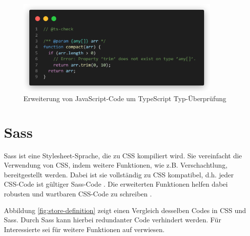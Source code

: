 \begin{figure}[H]
  \includegraphics[width=0.9\textwidth]{images/typescript-example-js.png}
  \centering
  \caption[Erweiterung von JavaScript-Code um TypeScript Typ-Überprüfung]{Erweiterung von JavaScript-Code um TypeScript Typ-Überprüfung}
  \label{fig:typescript-js}
\end{figure}

%
%
\section{Sass}
\label{sec:sass}
Sass ist eine Stylesheet-Sprache, die zu CSS kompiliert wird. Sie vereinfacht die Verwendung von CSS, indem weitere Funktionen, wie z.B. Verschachtlung, bereitgestellt werden. Dabei ist sie vollständig zu CSS kompatibel, d.h. jeder CSS-Code ist gültiger Sass-Code \cite[vgl.][]{SassDocs}. Die erweiterten Funktionen helfen dabei robusten und wartbaren CSS-Code zu schreiben \cite[vgl.][]{SassDocs}.

Abbildung \ref{fig:store-definition} zeigt einen Vergleich desselben Codes in CSS und Sass. Durch Sass kann hierbei redundanter Code verhindert werden. Für Interessierte sei für weitere Funktionen auf \cite{SassGuide} verwiesen.

